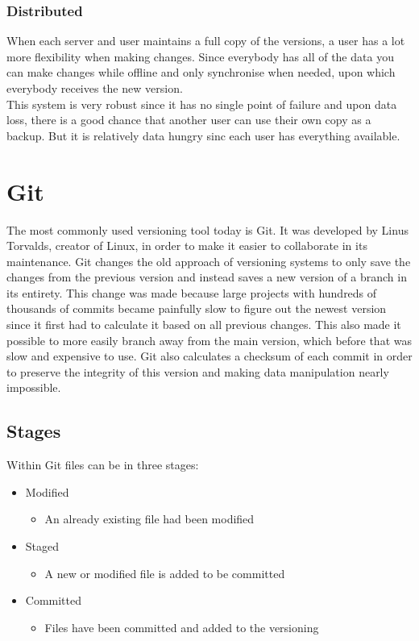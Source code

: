 \documentclass{article}
\begin{document}
	\subsubsection{Distributed}
	When each server and user maintains a full copy of the versions, a user has a lot more flexibility when making changes. Since everybody has all of the data you can make changes while offline and only synchronise when needed, upon which everybody receives the new version. \\
	This system is very robust since it has no single point of failure and upon data loss, there is a good chance that another user can use their own copy as a backup. But it is relatively data hungry sinc each user has everything available.
	\section{Git}
	The most commonly used versioning tool today is Git. It was developed by Linus Torvalds, creator of Linux, in order to make it easier to collaborate in its maintenance. Git changes the old approach of versioning systems to only save the changes from the previous version and instead saves a new version of a branch in its entirety. This change was made because large projects with hundreds of thousands of commits became painfully slow to figure out the newest version since it first had to calculate it based on all previous changes. This also made it possible to more easily branch away from the main version, which before that was slow and expensive to use. Git also calculates a checksum of each commit in order to preserve the integrity of this version and making data manipulation nearly impossible.
	\subsection{Stages}
	Within Git files can be in three stages:
	\begin{itemize}
		\item{Modified}
		\begin{itemize}
			\item{An already existing file had been modified}
		\end{itemize}
		\item{Staged}
		\begin{itemize}
			\item{A new or modified file is added to be committed}
		\end{itemize}
		\item{Committed}
		\begin{itemize}
			\item{Files have been committed and added to the versioning}
		\end{itemize}
	\end{itemize}
\end{document}
